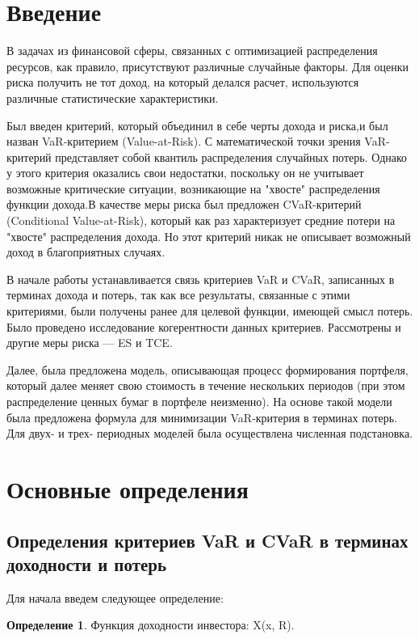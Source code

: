 \documentclass[14pt,a4paper]{article}
\theoremstyle{plain}
\theoremstyle{definition}
\newtheorem{Def}{Определение}[section]
\begin{document}
\parindent=1cm

\fontsize{14pt}{25pt}\selectfont
\tableofcontents
\newpage


\section{Введение}

В задачах из финансовой сферы, связанных с оптимизацией распределения ресурсов, как правило, присутствуют различные случайные факторы. Для оценки риска получить не тот доход, на который делался расчет, используются различные статистические характеристики.

Был введен критерий, который объединил в себе черты дохода и риска,и был назван VaR-критерием (Value-at-Risk). С математической точки зрения VaR-критерий представляет собой квантиль распределения случайных потерь.
Однако у этого критерия оказались свои недостатки, поскольку он не учитывает возможные критические ситуации, возникающие на "хвосте" распределения функции дохода.В качестве меры риска был предложен CVaR-критерий (Conditional Value-at-Risk), который как раз характеризует средние потери на "хвосте" распределения дохода. Но этот критерий никак не описывает возможный доход в благоприятных
случаях.

В начале работы устанавливается связь критериев VaR и CVaR, записанных в терминах дохода и потерь, так как все результаты, связанные с этими критериями,
были получены ранее для целевой функции, имеющей смысл потерь.
Было проведено исследование когерентности данных критериев. Рассмотрены и другие меры риска --- ES и TCE.

Далее, была предложена модель, описывающая процесс формирования портфеля, который далее меняет свою стоимость в течение нескольких периодов (при этом распределение ценных бумаг в портфеле неизменно).
На основе такой модели была предложена формула для минимизации VaR-критерия в терминах потерь.
Для двух- и трех- периодных моделей была осуществлена численная подстановка.

\section{Основные определения}
\subsection{Определения критериев VaR и CVaR в терминах доходности и потерь}
 \parindent=1cm

Для начала введем следующее определение:
\begin{Def} \label{main}
Функция доходности инвестора: X(x, R).
\end{Def}
\end{document}
